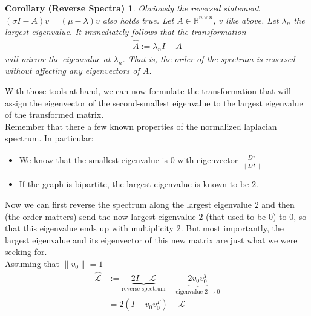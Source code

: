 \documentclass[10pt, a4paper, twocolumn]{article} %
\begin{document}
\newtheorem{Reversal}[]{Corollary (Reverse Spectra)}[section]
\begin{Reversal}
	Obviously the reversed statement $(\sigma I - A)v = (\mu - \lambda)v$ also holds true.
	Let $A \in \mathbb{R}^{n \times n}$, $v$ like above. Let $\lambda_n$ the largest eigenvalue.
	It immediately follows that the transformation
	\begin{align}
		\hat{A} := \lambda_n I - A
	\end{align}
	will mirror the eigenvalue at $\lambda_n$. That is, the order of the spectrum is reversed without affecting any eigenvectors of $A$.
\end{Reversal}
With those tools at hand, we can now formulate the transformation that will assign the eigenvector of the
second-smallest eigenvalue to the largest eigenvalue of the transformed matrix.
\\
Remember that there a few known properties of the normalized laplacian spectrum. In particular:
\begin{itemize}
	\item We know that the smallest eigenvalue is $0$ with eigenvector $\frac{D^\frac{1}{2}}{\lVert D^\frac{1}{2} \rVert}$ %
	\item If the graph is bipartite, the largest eigenvalue is known to be $2$.
\end{itemize}

Now we can first reverse the spectrum along the largest eigenvalue $2$ and then (the order matters) send the
now-largest eigenvalue $2$ (that used to be $0$) to $0$, so that this eigenvalue ends up with multiplicity 2.
But most importantly, the largest eigenvalue and its eigenvector of this new matrix are just what we were seeking for.
\\
Assuming that $\lVert v_0 \lVert = 1$
\begin{equation}\label{shiftedlaplacian}
	\begin{split}
		\hat{\mathcal{L}} & := \underbrace{2I - \mathcal{L}}_{\text{reverse spectrum}} - \underbrace{2 v_0 v_0^T}_{\text{eigenvalue $2 \rightarrow 0$}}\\
		& = 2 ( I - v_0 v_0^T ) - \mathcal{L}
	\end{split}
\end{equation}
\end{document}
